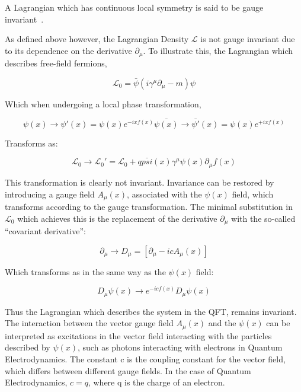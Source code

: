 A Lagrangian which has continuous local symmetry is said to be gauge invariant~\cite{Haywood}. 

As defined above however, the Lagrangian Density $\mathcal{L}$ is not gauge invariant due to its dependence on the derivative $\partial _{\mu}$. To illustrate this, the Lagrangian which describes free-field fermions\cite{QFT}, 

\begin{equation}
\mathcal{L}_{0} = \bar{\psi}(i\gamma^{\mu}\partial_{\mu} - m)\psi
\end{equation}

Which when undergoing a local phase transformation,

\begin{equation}
\psi(x) \rightarrow \psi'(x) = \psi(x)e^{-ixf(x)}
\bar{\psi(x)} \rightarrow \bar{\psi'}(x) = \psi(x)e^{+ixf(x)}
\end{equation}

Transforms as:

\begin{equation}
\mathcal{L}_{0} \rightarrow \mathcal{L}_{0}' = \mathcal{L}_{0} + q \bar{psi}(x)\gamma^{\mu}\psi(x)\partial_{\mu}f(x)
\end{equation}

This transformation is clearly not invariant. Invariance can be restored by introducing a gauge field $A_{\mu}(x)$, associated with the $\psi(x)$ field, which transforms according to the gauge transformation. 
The minimal substitution in $\mathcal{L}_{0}$ which achieves this is the replacement of the derivative $\partial_{\mu}$  with the so-called ``covariant derivative''\cite{QFT}:

\begin{equation}
\partial_{\mu} \rightarrow D_{\mu} = [ \partial_{\mu} - icA_{\mu}(x) ]
\end{equation}

Which transforms as in the same way as the $\psi(x)$ field:

\begin{equation}
D_{\mu}\psi(x) \rightarrow e^{-icf(x)}D_{\mu}\psi(x)
\end{equation}

Thus the Lagrangian which describes the system in the QFT, remains invariant. 
The interaction between the vector gauge field $A_{\mu}(x)$ and the $\psi(x)$ can be interpreted as excitations in the vector field interacting with the particles described by $\psi(x)$, such as photons interacting with electrons in Quantum Electrodynamics. 
The constant c is the coupling constant for the vector field, which differs between different gauge fields. 
In the case of Quantum Electrodynamics, $c = q$, where q is the charge of an electron\cite{QFT}.

